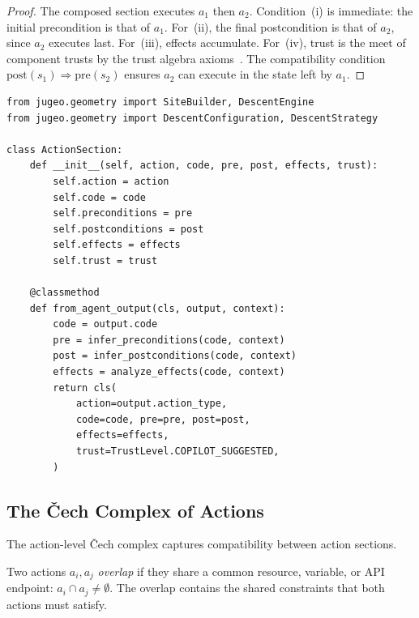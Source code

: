 \documentclass[11pt]{article}
\newcommand{\PreCond}{\mathrm{pre}}
\newcommand{\PostCond}{\mathrm{post}}
\begin{document}
\begin{proof}
The composed section executes $a_1$ then $a_2$.  Condition~(i) is
immediate: the initial precondition is that of $a_1$.  For~(ii), the
final postcondition is that of $a_2$, since $a_2$ executes last.
For~(iii), effects accumulate.  For~(iv), trust is the meet of component
trusts by the trust algebra axioms~\cite{JuGeo2024}.  The compatibility
condition $\PostCond(s_1) \Rightarrow \PreCond(s_2)$ ensures $a_2$ can
execute in the state left by $a_1$.
\end{proof}

\begin{lstlisting}[style=jugeo-python,caption={Building action sections from agent output.}]
from jugeo.geometry import SiteBuilder, DescentEngine
from jugeo.geometry import DescentConfiguration, DescentStrategy

class ActionSection:
    def __init__(self, action, code, pre, post, effects, trust):
        self.action = action
        self.code = code
        self.preconditions = pre
        self.postconditions = post
        self.effects = effects
        self.trust = trust

    @classmethod
    def from_agent_output(cls, output, context):
        code = output.code
        pre = infer_preconditions(code, context)
        post = infer_postconditions(code, context)
        effects = analyze_effects(code, context)
        return cls(
            action=output.action_type,
            code=code, pre=pre, post=post,
            effects=effects,
            trust=TrustLevel.COPILOT_SUGGESTED,
        )
\end{lstlisting}

\subsection{The \v{C}ech Complex of Actions}\label{subsec:cech-actions}

The action-level \v{C}ech complex captures compatibility between
action sections.

\begin{definition}\label{def:action-overlap}
Two actions $a_i, a_j$ \emph{overlap} if they share a common resource,
variable, or API endpoint: $a_i \cap a_j \neq \emptyset$.  The overlap
contains the shared constraints that both actions must satisfy.
\end{definition}
\end{document}
